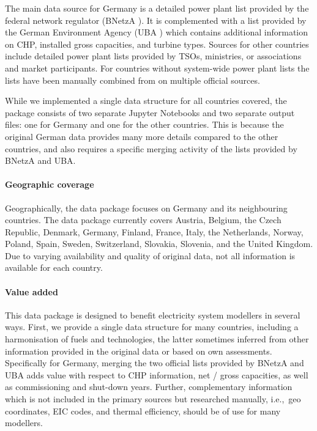 \documentclass[article,sort&compress]{elsarticle}
\begin{document}
The main data source for Germany is a detailed power plant list provided by the federal network regulator ({BNetzA} \cite{BNetzA}). It is complemented with a list provided by the German Environment Agency (UBA \cite{UBA}) which contains additional information on CHP, installed gross capacities, and turbine types. Sources for other countries include detailed power plant lists provided by TSOs, ministries, or associations and market participants. For countries without system-wide power plant lists the lists have been manually combined from on multiple official sources.

While we implemented a single data structure for all countries covered, the package consists of two separate Jupyter Notebooks and two separate output files: one for Germany and one for the other countries. This is because the original German data provides many more details compared to the other countries, and also requires a specific merging activity of the lists provided by {BNetzA} and UBA.

\paragraph{Geographic coverage}
Geographically, the data package focuses on Germany and its neighbouring countries. The data package currently covers Austria, Belgium, the Czech Republic, Denmark, Germany, Finland, France, Italy, the Netherlands, Norway, Poland, Spain, Sweden, Switzerland, Slovakia, Slovenia, and the United Kingdom. Due to varying availability and quality of original data, not all information is available for each country.

\paragraph{Value added}
This data package is designed to benefit electricity system modellers in several ways. First, we provide a single data structure for many countries, including a harmonisation of fuels and technologies, the latter sometimes inferred from other information provided in the original data or based on own assessments. Specifically for Germany, merging the two official lists provided by {BNetzA} and UBA adds value with respect to CHP information, net / gross capacities, as well as commissioning and shut-down years. Further, complementary information which is not included in the primary sources but  researched manually, i.e.,~geo coordinates, EIC codes, and thermal efficiency, should be of use for many modellers.
\end{document}
